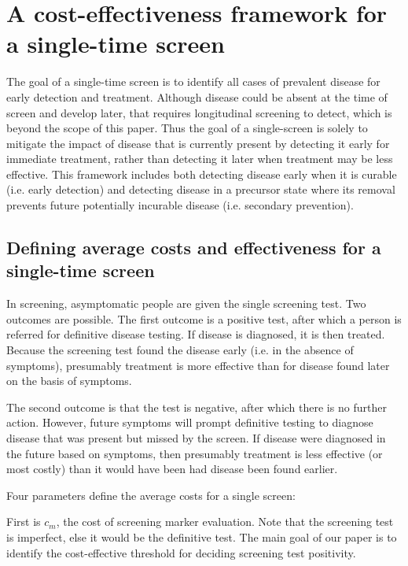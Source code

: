 \documentclass[AMA,STIX1COL]{WileyNJD-v2}
\begin{document}
\section{A cost-effectiveness framework for a single-time screen}

The goal of a single-time screen is to identify all cases of prevalent disease for early detection and treatment.  Although disease could be absent at the time of screen and develop later, that requires longitudinal screening to detect, which is beyond the scope of this paper.  Thus the goal of a single-screen is solely to mitigate the impact of disease that is currently present by detecting it early for immediate treatment, rather than detecting it later when treatment may be less effective.  This framework includes both detecting disease early when it is curable (i.e. early detection) and detecting disease in a precursor state where its removal prevents future potentially incurable disease (i.e. secondary prevention). 

\subsection{Defining average costs and effectiveness for a single-time screen} 
\label{sec:framework}

In screening, asymptomatic people are given the single screening test.  Two outcomes are possible.  The first outcome is a positive test, after which a person is referred for definitive disease testing.  If disease is diagnosed, it is then treated.  Because the screening test found the disease early (i.e. in the absence of symptoms), presumably treatment is more effective than for disease found later on the basis of symptoms.

The second outcome is that the test is negative, after which there is no further action.  However, future symptoms will prompt definitive testing to diagnose disease that was present but missed by the screen.  If disease were diagnosed in the future based on symptoms, then presumably treatment is less effective (or most costly) than it would have been had disease been found earlier.

\noindent Four parameters define the average costs for a single screen:  

First is $c_m$, the cost of screening marker evaluation.  Note that the screening test is imperfect, else it would be the definitive test.  The main goal of our paper is to identify the cost-effective threshold for deciding screening test positivity.  
\end{document}
